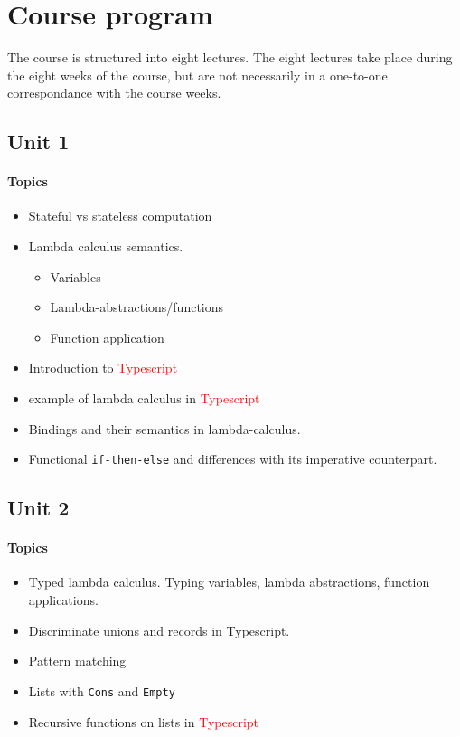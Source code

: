 \section{Course program}
The course is structured into eight lectures.
The eight lectures take place during the eight weeks of the course, but are not necessarily in a one-to-one correspondance with the course weeks.

\subsection*{Unit 1}
\paragraph*{Topics}
\begin{itemize}[noitemsep]
	\item Stateful vs stateless computation
  \item Lambda calculus semantics.
    \begin{itemize}[noitemsep]
      \item Variables
      \item Lambda-abstractions/functions
      \item Function application
    \end{itemize}	
  \item Introduction to \textcolor{red}{Typescript}
  \item example of lambda calculus in \textcolor{red}{Typescript}
  \item Bindings and their semantics in lambda-calculus.
  \item Functional \texttt{if-then-else} and differences with its imperative counterpart.
\end{itemize}

\subsection*{Unit 2}
\paragraph*{Topics}			
\begin{itemize}[noitemsep]
	\item Typed lambda calculus. Typing variables, lambda abstractions, function applications.
  \item Discriminate unions and records in Typescript.
  \item Pattern matching
  \item Lists with \texttt{Cons} and \texttt{Empty}
  \item Recursive functions on lists in \textcolor{red}{Typescript}
\end{itemize}

